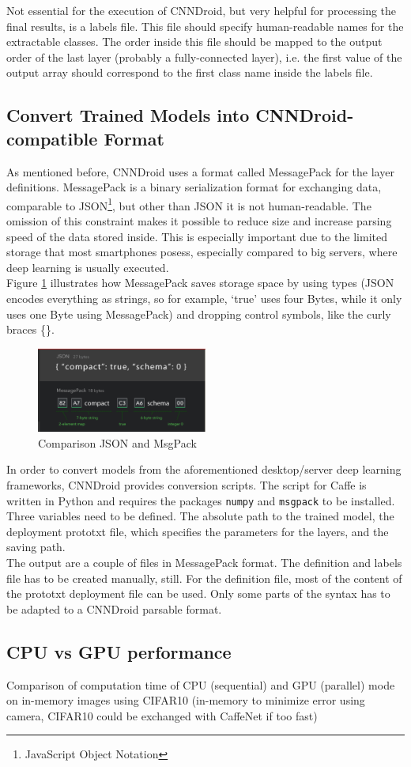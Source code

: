Not essential for the execution of CNNDroid, but very helpful for processing the final results, is a labels file. This file should specify human-readable names for the extractable classes. The order inside this file should be mapped to the output order of the last layer (probably a fully-connected layer), i.e. the first value of the output array should correspond to the first class name inside the labels file.

\subsection{Convert Trained Models into CNNDroid-compatible Format}
As mentioned before, CNNDroid uses a format called MessagePack for the layer definitions. MessagePack is a binary serialization format for exchanging data, comparable to JSON\footnote{JavaScript Object Notation}, but other than JSON it is not human-readable. The omission of this constraint makes it possible to reduce size and increase parsing speed of the data stored inside. This is especially important due to the limited storage that most smartphones posess, especially compared to big servers, where deep learning is usually executed.\\
Figure \ref{fig:json_vs_msgpack} illustrates how MessagePack saves storage space by using types (JSON encodes everything as strings, so for example, `true' uses four Bytes, while it only uses one Byte using MessagePack) and dropping control symbols, like the curly braces \{\}.

\begin{figure}[H]
  \centering
    \includegraphics[width=0.5\textwidth]{json_vs_msgpack.png}
  \caption{Comparison JSON and MsgPack}
  \label{fig:json_vs_msgpack}
\end{figure}

In order to convert models from the aforementioned desktop/server deep learning frameworks, CNNDroid provides conversion scripts. The script for Caffe is written in Python and requires the packages \lstinline[language=python]{numpy} and \lstinline[language=python]{msgpack} to be installed.\\
Three variables need to be defined. The absolute path to the trained model, the deployment prototxt file, which specifies the parameters for the layers, and the saving path.\\
The output are a couple of files in MessagePack format. The definition and labels file has to be created manually, still. For the definition file, most of the content of the prototxt deployment file can be used. Only some parts of the syntax has to be adapted to a CNNDroid parsable format.

\subsection{CPU vs GPU performance}
Comparison of computation time of CPU (sequential) and GPU (parallel) mode on in-memory images using CIFAR10 (in-memory to minimize error using camera, CIFAR10 could be exchanged with CaffeNet if too fast)